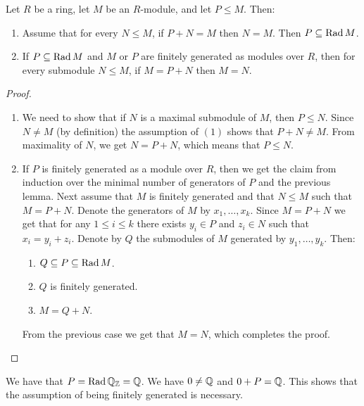 \documentclass[11pt,a4paper]{article}
\begin{document}
\begin{lemma}
  Let $R$ be a ring, let $M$ be an $R$-module,
  and let $P \leqslant M$.
  Then:
  \begin{enumerate}
    \item[(1)] Assume that for every $N \leqslant M$,
      if $P + N = M$ then $N = M$.
      Then $P \subseteq \operatorname{Rad} M$.
    \item[(2)] If $P \subseteq \operatorname{Rad} M$ and $M$ or $P$
      are finitely generated as modules over $R$,
      then for every submodule $N \leqslant M$,
      if $M = P + N$ then $M = N$.
  \end{enumerate}
\end{lemma}
\begin{proof} \phantom{}
  \begin{enumerate}
    \item[(1)] We need to show that if $N$ is a maximal submodule of $M$,
      then $P \leqslant N$.
      Since $N \neq M$ (by definition) the assumption of $(1)$
      shows that $P + N \neq M$.
      From maximality of $N$, we get $N = P + N$,
      which means that $P \leqslant N$.
    \item[(2)] If $P$ is finitely generated as a module over $R$,
      then we get the claim from induction over the minimal number of
      generators of $P$ and the previous lemma.
      Next assume that $M$ is finitely generated and that $N \leqslant M$
      such that $M = P + N$.
      Denote the generators of $M$ by $x_1,\dots,x_k$.
      Since $M = P + N$ we get that for any $1 \le i \le k$ there exists
      $y_i \in P$ and $z_i \in N$ such that $x_i = y_i + z_i$.
      Denote by $Q$ the submodules of $M$ generated by $y_1,\dots,y_k$.
      Then:
      \begin{enumerate}
        \item[(1)] $Q \subseteq P \subseteq \operatorname{Rad} M$.
        \item[(2)] $Q$ is finitely generated.
        \item[(3)] $M = Q + N$.
      \end{enumerate}
      From the previous case we get that $M = N$, which completes the proof.
  \end{enumerate}
\end{proof}

\begin{example}
  We have that $P = \operatorname{Rad} \mathbb{Q}_{\mathbb{Z}} = \mathbb{Q}$.
  We have $0 \neq \mathbb{Q}$ and $0 + P = \mathbb{Q}$.
  This shows that the assumption of being finitely generated is necessary.
\end{example}
\end{document}
